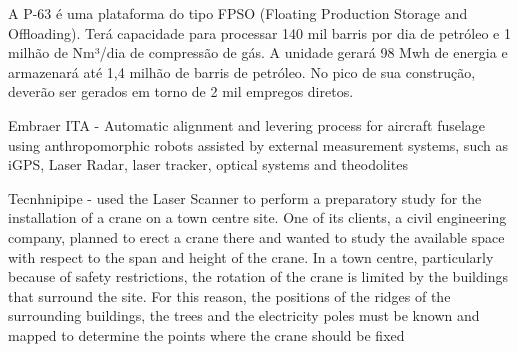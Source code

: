 A P-63 é uma plataforma do tipo FPSO (Floating Production Storage and
Offloading). Terá capacidade para processar 140 mil barris por dia de 
petróleo e 1 milhão de Nm³/dia de compressão de gás. A unidade gerará 
98 Mwh de energia e armazenará até 1,4 milhão de barris de petróleo. 
No pico de sua construção, deverão ser gerados em torno de 2 mil empregos 
diretos.

Embraer ITA - Automatic alignment and levering process for aircraft fuselage
using anthropomorphic robots assisted by external measurement systems, such
as iGPS, Laser Radar, laser tracker, optical systems and theodolites 

Tecnhnipipe - used the Laser Scanner to perform a preparatory study for 
the installation of a crane on a town centre site. One of its clients, 
a civil engineering company, planned to erect a crane there and wanted 
to study the available space with respect to the span and height of the 
crane. In a town centre, particularly because of safety restrictions, the rotation of the crane is limited by the buildings that surround the site. For this reason, the positions of the ridges of the surrounding buildings, the trees and the electricity poles must be known and mapped to determine the points where the crane should be fixed
